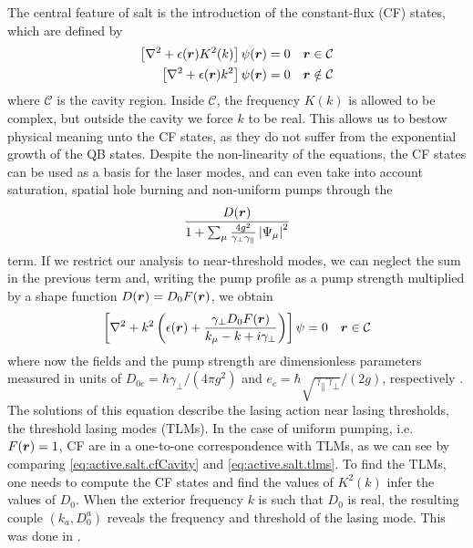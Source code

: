 The central feature of \gls{salt} is the introduction of the constant-flux (CF)
states, which are defined by
	\begin{subequations}
	\begin{align}
		\left[\nabla^2+\epsilon(\boldsymbol{r})K^2(k)\right]\psi(\boldsymbol{r})	&=	0	& \boldsymbol{r}\in\mathcal{C}		\label{eq:active.salt.cfCavity}\\
		\left[\nabla^2+\epsilon(\boldsymbol{r})k^2\right]\psi(\boldsymbol{r})		&=	0	& \boldsymbol{r}\notin\mathcal{C}	\label{eq:active.salt.cfOutside}
	\end{align}
	\end{subequations}
where $\mathcal{C}$ is the cavity region. Inside $\mathcal{C}$, 
the frequency $K(k)$ is allowed to be complex, but outside the cavity
we force $k$ to be real. This allows us to bestow physical meaning
unto the CF states, as they do not suffer from the exponential
growth of the QB states. Despite the non-linearity of the equations, 
the CF states can be used as a basis for the laser modes, and can even 
take into account saturation, spatial hole burning and non-uniform
pumps through the 
	\begin{equation*}
		\label{eq:active.salt.tlms}
		\frac{D(\boldsymbol{r})}{1+\sum_\mu\frac{4g^2}{\gamma_\perp\gamma_\parallel}\left|\Psi_\mu\right|^2}
	\end{equation*}
term. If we restrict our analysis to near-threshold modes, we can neglect the sum in the previous term
and, writing the pump profile as a pump strength multiplied by a shape function $D(\boldsymbol{r})=D_0F(\boldsymbol{r})$, 
we obtain
	\begin{align}
		\left[\nabla^2+k^2\left(\epsilon(\boldsymbol{r})+\frac{\gamma_\perp D_0F(\boldsymbol{r})}{k_\mu-k+i\gamma_\perp}\right)\right]\psi &=0 & \boldsymbol{r}\in\mathcal{C}
	\end{align}
where now the fields and the pump strength are dimensionless parameters measured in units of $D_{0c}=\hbar\gamma_\perp/(4\pi g^2)$
and $e_c = \hbar\sqrt{\gamma_\parallel\gamma_\perp}/(2g)$, respectively \cite[p.~19--20]{GE2010b}. 
The solutions of this equation describe the lasing action near lasing thresholds, the threshold lasing modes (TLMs). 
In the case of uniform pumping, i.e. $F(\boldsymbol{r})=1$,
CF are in a one-to-one correspondence with TLMs, as we can see by comparing
\eqref{eq:active.salt.cfCavity} and \eqref{eq:active.salt.tlms}. To find
the TLMs, one needs to compute the CF states and find the values of $K^2(k)$
infer the values of $D_0$. When the exterior frequency $k$ is such that $D_0$
is real, the resulting couple $(k_a, D_0^a)$ reveals the frequency and threshold
of the lasing mode. This was done in \cite{GAG2014a}. 

